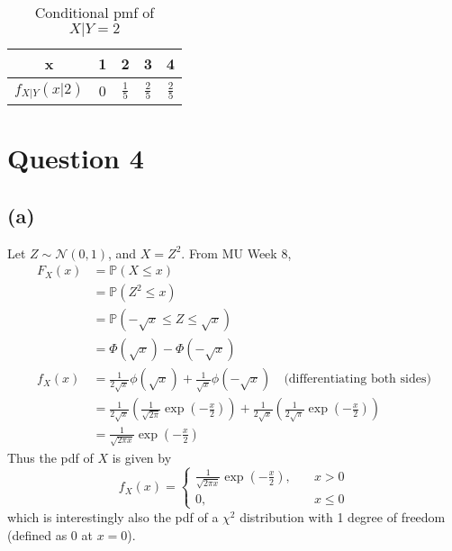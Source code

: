 \documentclass[12pt]{article}
\begin{document}
\begin{table}[H]
    \centering
    \def\arraystretch{1.3}
    \begin{tabular}{| c | c | c | c | c |}
        \hline x & 1 & 2 & 3 & 4 \\ \hline 
        $f_{X|Y} (x | 2)$ & 0 & $\frac{1}{5}$ & $\frac{2}{5}$ & $\frac{2}{5}$ \\ \hline 
    \end{tabular}
    \caption{Conditional pmf of $X | Y = 2$}
    \label{tab: 3-conditionalpmf}
\end{table}

\newpage

\section*{Question 4}

\subsection*{(a)}

Let $Z \sim \mathcal{N}(0,1)$, and $X = Z^{2}$. From MU Week 8, \begin{align*}
    F_X (x) &= \mathbb{P}(X \leq x) \\ 
    &= \mathbb{P}(Z^{2} \leq x) \\ 
    &= \mathbb{P}(-\sqrt{x} \leq Z \leq \sqrt{x}) \\ 
    &= \Phi(\sqrt{x}) - \Phi(-\sqrt{x}) \\ 
    f_X (x) &= \frac{1}{2\sqrt{x}} \phi(\sqrt{x}) + \frac{1}{\sqrt{x}} \phi(-\sqrt{x}) \quad \text{(differentiating both sides)}\\  
    &= \frac{1}{2\sqrt{x}}\left( \frac{1}{\sqrt{2\pi}} \exp\left(-\frac{x}{2}\right)\right) + \frac{1}{2\sqrt{x}}\left( \frac{1}{2\sqrt{\pi}}\exp \left(-\frac{x}{2}\right) \right) \\ 
    &= \frac{1}{\sqrt{2\pi x}}\exp \left(-\frac{x}{2}\right)
\end{align*} Thus the pdf of $X$ is given by \begin{equation}\label{4-pdfx}
    f_X (x) = \begin{cases}
        \displaystyle\frac{1}{\sqrt{2\pi x}}\exp \left(-\frac{x}{2}\right), \quad & x > 0 \\ 
        0, \quad & x \leq 0
    \end{cases}
\end{equation} which is interestingly also the pdf of a $\chi^{2}$ distribution with 1 degree of freedom (defined as 0 at $x = 0$). \\ 
\end{document}

